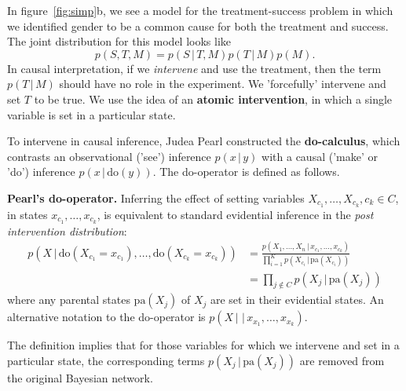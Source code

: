 \documentclass{article}
\newcommand{\giv}{\,|\,}
\begin{document}
In figure~\ref{fig:simp}b, we see a model for the treatment-success problem in which we identified gender to be a common cause for both the treatment and success. The joint distribution for this model looks like 
$$
    p(S, T, M) = p(S \giv T, M) p(T \giv M) p(M) .
$$
In causal interpretation, if we \textit{intervene} and use the treatment, then the term $p(T \giv M)$ should have no role in the experiment. We 'forcefully' intervene and set $T$ to be true. We use the idea of an \textbf{atomic intervention}, in which a single variable is set in a particular state. 

To intervene in causal inference, Judea Pearl constructed the \textbf{do-calculus}, which contrasts an observational ('see') inference $p(x \giv y)$ with a causal ('make' or 'do') inference $p(x \giv \text{do}(y))$. The do-operator is defined as follows.
\\
\begin{theorem}
    \textbf{Pearl's do-operator.} Inferring the effect of setting variables $X_{c_1}, \dots, X_{c_k}, c_k \in C$, in states $x_{c_1}, \dots, x_{c_k}$, is equivalent to standard evidential inference in the \textit{post intervention distribution}:
    \begin{align*}
        p(X \giv \text{do}(X_{c_1} = x_{c_1}), \dots, \text{do}(X_{c_k} = x_{c_k})) &= \frac{p(X_1, \dots, X_n \giv x_{c_1}, \dots, x_{c_k})}{\prod_{i=1}^K p(X_{c_i} \giv \text{pa}(X_{c_i}))} \\[1em]
        &= \prod_{j \notin C} p(X_j \giv \text{pa}(X_j))
    \end{align*}
    where any parental states $\text{pa}(X_j)$ of $X_j$ are set in their evidential states. An alternative notation to the do-operator is $p(X \giv \giv x_{x_1}, \dots, x_{x_k})$. 
\end{theorem}

\noindent The definition implies that for those variables for which we intervene and set in a particular state, the corresponding terms $p(X_j \giv \text{pa}(X_j))$ are removed from the original Bayesian network. 
\end{document}
